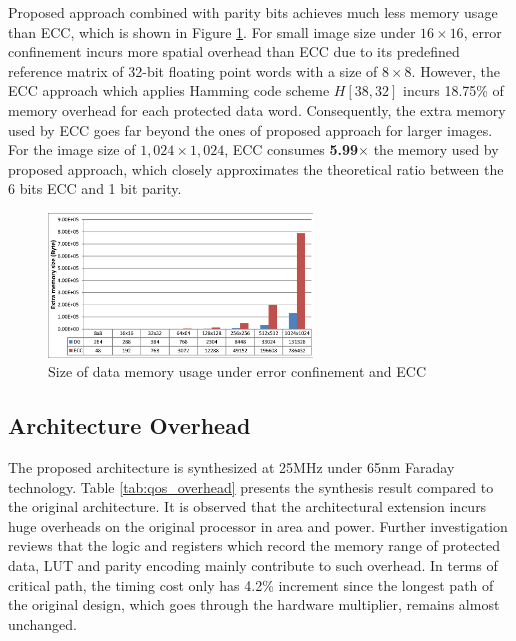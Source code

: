 Proposed approach combined with parity bits achieves much less memory usage than ECC, which is shown in Figure \ref{fig:qos_size}. For small image size under $16 \times 16$, error confinement incurs more spatial overhead than ECC due to its predefined reference matrix of 32-bit floating point words with a size of $8 \times 8$. However, the ECC approach which applies Hamming code scheme $H[38, 32]$ incurs 18.75\% of memory overhead for each protected data word. Consequently, the extra memory used by ECC goes far beyond the ones of proposed approach for larger images. For the image size of $1,024 \times 1,024$, ECC consumes \textbf{5.99}$\times$ the memory used by proposed approach, which closely approximates the theoretical ratio between the 6 bits ECC and 1 bit parity.

\begin{figure}
\centering
\includegraphics[width=70mm]{./eps/qos_size}
\caption{Size of data memory usage under error confinement and ECC}
\vspace{-4mm}
\label{fig:qos_size}
\end{figure}

\subsection{Architecture Overhead} \label{sec::head_overhead}
The proposed architecture is synthesized at 25MHz under 65nm Faraday technology. Table \ref{tab:qos_overhead} presents the synthesis result compared to the original architecture. It is observed that the architectural extension incurs huge overheads on the original processor in area and power. Further investigation reviews that the logic and registers which record the memory range of protected data, LUT and parity encoding mainly contribute to such overhead. In terms of critical path, the timing cost only has 4.2\% increment since the longest path of the original design, which goes through the hardware multiplier, remains almost unchanged.

